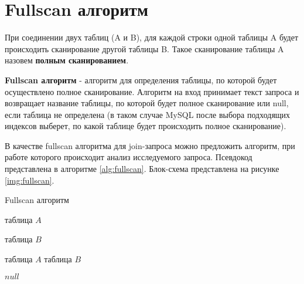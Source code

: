 \section{Fullscan алгоритм}

При соединении двух таблиц (A и B), для каждой строки одной таблицы A будет происходить сканирование другой таблицы B. Такое сканирование таблицы A назовем \textbf{полным сканированием}. 

\textbf{Fullscan алгоритм} - алгоритм для определения таблицы, по которой будет осуществлено полное сканирование. Алгоритм на вход принимает текст запроса и возвращает название таблицы, по которой будет полное сканирование или null, если таблица не определена (в таком случае MySQL после выбора подходящих индексов выберет, по какой таблице будет происходить полное сканирование).

В качестве fullscan алгоритма для join-запроса можно предложить алгоритм, при работе которого происходит анализ исследуемого запроса. Псевдокод представлена в алгоритме \ref{alg:fullscan}. Блок-схема представлена на рисунке \ref{img:fullscan}.

\begin{algorithm}[h]
\caption{Fullscan алгоритм}\label{alg:fullscan}
\begin{algorithmic}[1]
 
        \Else
            \State \Return таблица $A$
        \EndIf
    \EndIf
    \Statex 
    
        \Else
            \State \Return таблица $B$
        \EndIf
    \EndIf
    \Statex 

            \State \Return таблица $A$
            \State \Return таблица $B$
        \EndIf
    \EndIf
    \Statex 

    \State \Return $null$
\EndFunction
 
\end{algorithmic}
\end{algorithm}

